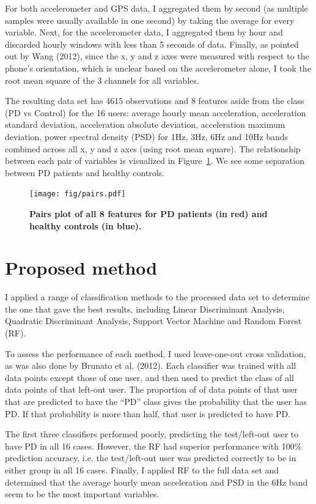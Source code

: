 \documentclass[8pt]{article}
\begin{document}
For both accelerometer and GPS data, I aggregated them by second (as multiple samples were usually available in one second) by taking the average for every variable. Next, for the accelerometer data, I aggregated them by hour and discarded hourly windows with less than 5 seconds of data. Finally, as pointed out by Wang (2012), since the x, y and z axes were measured with respect to the phone's orientation, which is unclear based on the accelerometer alone, I took the root mean square of the 3 channels for all variables.

The resulting data set has 4615 observations and 8 features aside from the class (PD vs Control) for the 16 users: average hourly mean acceleration, acceleration standard deviation, acceleration absolute deviation, acceleration maximum deviation, power spectral density (PSD) for 1Hz, 3Hz, 6Hz and 10Hz bands combined across all x, y and z axes (using root mean square). The relationship between each pair of variables is visualized in Figure~\ref{fig:pairs}. We see some separation between PD patients and healthy controls.

\begin{figure}[htb]
	\begin{center} 
		\texttt{[image: fig/pairs.pdf]}
		\caption{{\bf Pairs plot of all 8 features for PD patients (in red) and healthy controls (in blue).}}
		\label{fig:pairs}
	\end{center}
\end{figure}
\section{Proposed method}
I applied a range of classification methods to the processed data set to determine the one that gave the best results, including Linear Discriminant Analysis, Quadratic Discriminant Analysis, Support Vector Machine and Random Forest (RF).

To assess the performance of each method, I used leave-one-out cross validation, as was also done by Brunato et al. (2012). Each classifier was trained with all data points except those of one user, and then used to predict the class of all data points of that left-out user. The proportion of of data points of that user that are predicted to have the ``PD'' class gives the probability that the user has PD. If that probability is more than half, that user is predicted to have PD. 

The first three classifiers performed poorly, predicting the test/left-out user to have PD in all 16 cases. However, the RF had superior performance with 100\% prediction accuracy, i.e. the test/left-out user was predicted correctly to be in either group in all 16 cases. Finally, I applied RF to the full data set and determined that the average hourly mean acceleration and PSD in the 6Hz band seem to be the most important variables.
\end{document}
